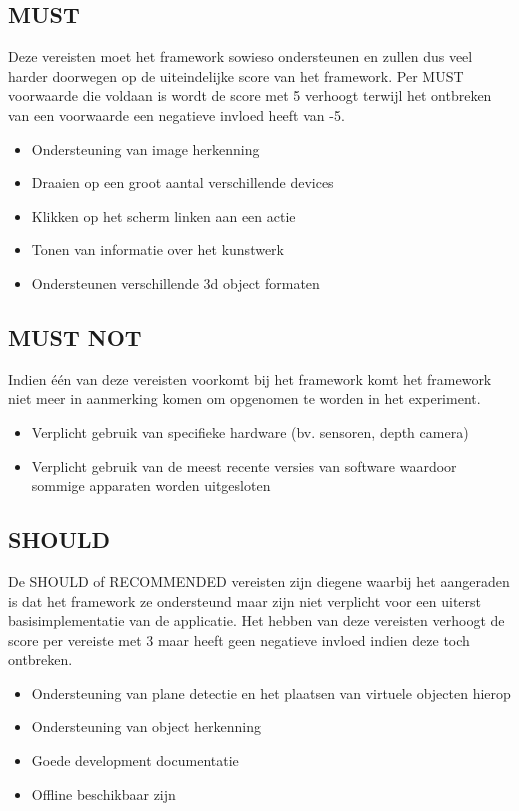 \subsection{MUST}
Deze vereisten moet het framework sowieso ondersteunen en zullen dus veel harder doorwegen op de uiteindelijke score van het framework. Per MUST voorwaarde die voldaan is wordt de score met 5 verhoogt terwijl het ontbreken van een voorwaarde een negatieve invloed heeft van -5.
\begin{itemize}
    \item Ondersteuning van image herkenning
    \item Draaien op een groot aantal verschillende devices
    \item Klikken op het scherm linken aan een actie
    \item Tonen van informatie over het kunstwerk
    \item Ondersteunen verschillende 3d object formaten
\end{itemize} 

\subsection{MUST NOT}
Indien één van deze vereisten voorkomt bij het framework komt het framework niet meer in aanmerking komen om opgenomen te worden in het experiment.
\begin{itemize}
    \item Verplicht gebruik van specifieke hardware (bv. sensoren, depth camera)
    \item Verplicht gebruik van de meest recente versies van software waardoor sommige apparaten worden uitgesloten
\end{itemize} 

\subsection{SHOULD}
De SHOULD of RECOMMENDED vereisten zijn diegene waarbij het aangeraden is dat het framework ze ondersteund maar zijn niet verplicht voor een uiterst basisimplementatie van de applicatie. Het hebben van deze vereisten verhoogt de score per vereiste met 3 maar heeft geen negatieve invloed  indien deze toch ontbreken.
\begin{itemize}
    \item Ondersteuning van plane detectie en het plaatsen van virtuele objecten hierop
    \item Ondersteuning van object herkenning
    \item Goede development documentatie
    \item Offline beschikbaar zijn
\end{itemize} 

